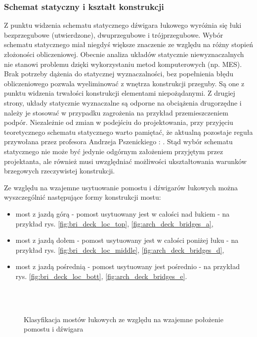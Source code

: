 \subsubsection{Schemat statyczny i kształt konstrukcji}
Z punktu widzenia schematu statycznego dźwigara łukowego wyróżnia się łuki bezprzegubowe (utwierdzone), dwuprzegubowe i trójprzegubowe. Wybór schematu statycznego miał niegdyś większe znaczenie ze względu na różny stopień złożoności obliczeniowej. Obecnie analiza układów statycznie niewyznaczalnych nie stanowi problemu dzięki wykorzystaniu metod komputerowych (np. MES). Brak potrzeby dążenia do statycznej wyznaczalności, bez popełnienia błędu obliczeniowego pozwala wyeliminować z wnętrza konstrukcji przeguby. Są one z punktu widzenia trwałości konstrukcji elementami niepożądanymi. Z drugiej strony, układy statycznie wyznaczalne są odporne na obciążenia drugorzędne i należy je stosować w przypadku zagrożenia na przykład przemieszczeniem podpór. Niezależnie od zmian w podejściu do projektowania, przy przyjęciu teoretycznego schematu statycznego warto pamiętać, że aktualną pozostaje reguła przywołana przez profesora Andrzeja Pszenickiego \cite{Pszenicki1954}: . Stąd wybór schematu statycznego nie może być jedynie odgórnym założeniem przyjętym przez projektanta, ale również musi uwzględniać możliwości ukształtowania warunków brzegowych rzeczywistej konstrukcji. 

Ze względu na wzajemne usytuowanie pomostu i dźwigarów łukowych można wyszczególnić następujące formy konstrukcji mostu:
\begin{itemize}
	\item most z jazdą górą - pomost usytuowany jest w całości nad łukiem - na przykład rys. \ref{fig:bri_deck_loc_top}, \ref{fig:arch_deck_bridges_a},
	\item most z jazdą dołem - pomost usytuowany jest w całości poniżej łuku - na przykład rys. \ref{fig:bri_deck_loc_middle}, \ref{fig:arch_deck_bridges_d},
	\item most z jazdą pośrednią - pomost usytuowany jest pośrednio - na przykład rys. \ref{fig:bri_deck_loc_bott}, \ref{fig:arch_deck_bridges_e}.
\end{itemize}

\begin{figure}[hbt!]
	\centering
	  \\
	 \\
	\captionsetup{justification=centering}
	\caption{Klasyfikacja mostów łukowych ze względu na wzajemne położenie pomostu i dźwigara}
	\label{fig:bridges_types_deck_location}
\end{figure}

